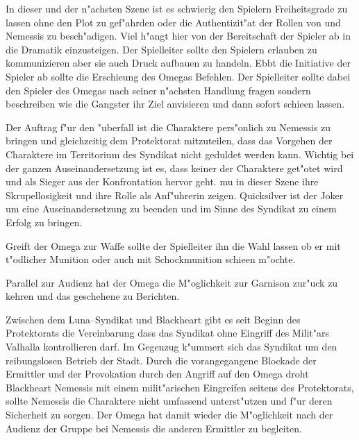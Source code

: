\begin{remarks}
	In dieser und der n"achsten Szene ist es schwierig den Spielern Freiheitsgrade zu lassen ohne den Plot zu gef"ahrden oder die Authentizit"at der Rollen von \xl{} und Nemessis zu besch"adigen. Viel h"angt hier von der Bereitschaft der Spieler ab in die Dramatik einzusteigen. Der Spielleiter sollte den Spielern erlauben zu kommunizieren aber sie auch Druck aufbauen zu handeln. Ebbt die Initiative der Spieler ab sollte \xl{} die Erschie\3ung des Omegas Befehlen. Der Spielleiter sollte dabei den Spieler des Omegas nach seiner n"achsten Handlung fragen sondern beschreiben wie die Gangster ihr Ziel anvisieren und dann sofort schie\3en lassen.

	Der Auftrag f"ur den "uberfall ist die Charaktere pers"onlich zu Nemessis zu bringen und gleichzeitig dem Protektorat mitzuteilen, dass das Vorgehen der Charaktere im Territorium des Syndikat nicht geduldet werden kann. Wichtig bei der ganzen Auseinandersetzung ist es, dass keiner der Charaktere get"otet wird und \xl{} als Sieger aus der Konfrontation hervor geht. \xl{} mu\3 in dieser Szene ihre Skrupellosigkeit und ihre Rolle als Anf"uhrerin zeigen. Quicksilver ist der Joker um eine Auseinandersetzung zu beenden und im Sinne des Syndikat zu einem Erfolg zu bringen.

	Greift der Omega zur Waffe sollte der Spielleiter ihn die Wahl lassen ob er mit t"odlicher Munition oder auch mit Schockmunition schie\3en m"ochte.
\end{remarks}



Parallel zur Audienz hat der Omega die M"oglichkeit zur Garnison zur"uck zu kehren und das geschehene zu Berichten. 

Zwischen dem Luna--Syndikat und Blackheart gibt es seit Beginn des Protektorats die Vereinbarung dass das Syndikat ohne Eingriff des Milit"ars Valhalla kontrollieren darf. Im Gegenzug k"ummert sich das Syndikat um den reibungslosen Betrieb der Stadt. Durch die  vorangegangene Blockade der Ermittler und der Provokation durch den Angriff auf den Omega droht Blackheart Nemessis mit einem milit"arischen Eingreifen seitens des Protektorats, sollte Nemessis die Charaktere nicht umfassend unterst"utzen und f"ur deren Sicherheit zu sorgen. Der Omega hat damit wieder die M"oglichkeit nach der Audienz der Gruppe bei Nemessis die anderen Ermittler zu begleiten.



